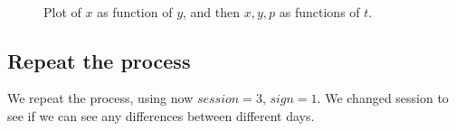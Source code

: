 \documentclass[a4paper]{article}
\begin{document}
{\begin{figure}[H]
  \centering
  \qquad
  \\
  \qquad%
  \caption{Plot of $x$ as function of $y$, and then $x,y,p$ as functions of $t$.}
  \label{fig:four:signals}
\end{figure}

\subsection*{Repeat the process}

We repeat the process, using now \(session = 3\), \(sign=1\). We changed session to see if we can see any differences between different days.

}
\end{document}
